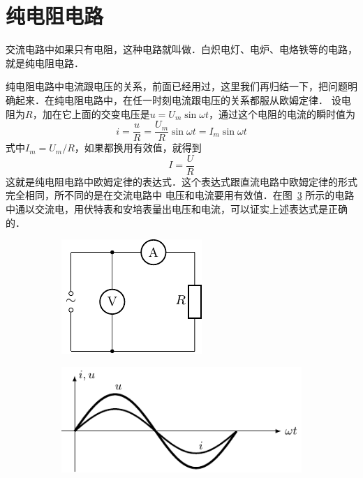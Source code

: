 \section{纯电阻电路}
交流电路中如果只有电阻，这种电路就叫做．白炽电灯、电炉、电烙铁等的电路，就是纯电阻电路．

纯电阻电路中电流跟电压的关系，前面已经用过，这里我们再归结一下，把问题明确起来．在纯电阻电路中，在任一时刻电流跟电压的关系都服从欧姆定律．
设电阻为$R$，加在它上面的交变电压是$u=U_m\sin \omega t$，通过这个电阻的电流的瞬时值为
\[i=\frac{u}{R}=\frac{U_m}{R}\sin\omega t=I_m\sin\omega t\]
式中$I_m=U_m/R$，如果都换用有效值，就得到
\begin{equation}\label{eq_C_3-7}
    I=\frac{U}{R}
\end{equation}
这就是纯电阻电路中欧姆定律的表达式．这个表达式跟直流电路中欧姆定律的形式完全相同，所不同的是在交流电路中
电压和电流要用有效值．在图~\ref{fig_C_3-11} 所示的电路中通以交流电，用伏特表和安培表量出电压和电流，可以证实上述表达式是正确的．
\begin{figure}[htbp]
    \centering
    \begin{subfigure}{0.4\linewidth}
        \centering
        \includegraphics{fig/C/3-11a.pdf}
        \caption{}\label{fig_C_3-11a}
    \end{subfigure}
    \hfil
    \begin{subfigure}{0.4\linewidth}
        \centering
        \includegraphics{fig/C/3-11b.pdf}
        \caption{}\label{fig_C_3-11b}
    \end{subfigure}
    \caption{}\label{fig_C_3-11}
\end{figure}

